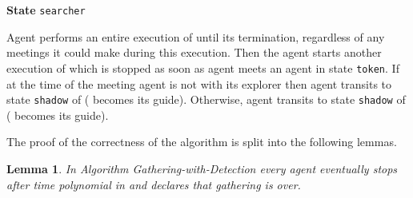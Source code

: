 \documentclass[11pt]{article}
\newtheorem{lemma}{Lemma}[section]
\begin{document}
     \vspace*{0.2cm}
 
  \noindent
  {\bf State} {\tt searcher}
    
{Agent  performs an entire execution of  until its termination, regardless of any meetings it could make during this execution. Then the agent starts another execution of  which is stopped as soon as agent  meets an agent  in state {\tt token}.}
{If at the time of the meeting agent  is not with its explorer  then agent  transits to state {\tt shadow} of  ( becomes its guide). Otherwise, agent  transits to state {\tt shadow} of  ( becomes its guide).}

\vspace*{0.5cm}
The proof of the correctness of the algorithm is split into the following lemmas.

\begin{lemma}\label{term}
In Algorithm Gathering-with-Detection every agent eventually stops after time polynomial in  and declares that gathering is over.
\end{lemma}
\end{document}
